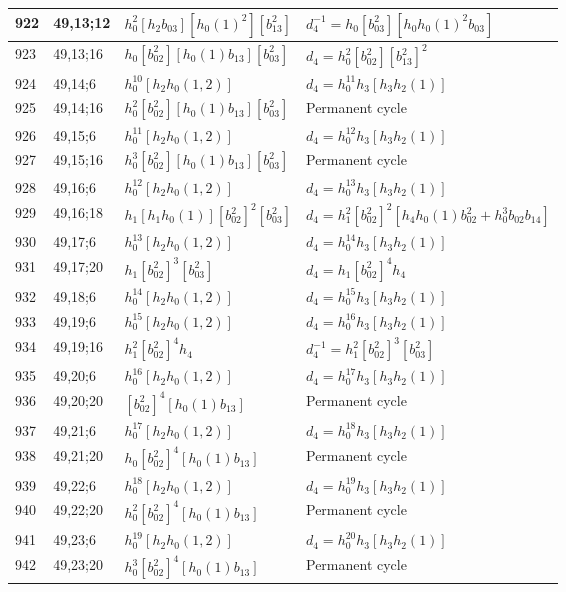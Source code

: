 \documentclass{article}
\begin{document}
\begin{longtable}{|l|l|>{\raggedright\arraybackslash}p{6cm}|>{\raggedright\arraybackslash}p{6cm}|}
\hline
922 & 49,13;12 & $h_0^2[h_2b_{03}][h_0(1)^2][b_{13}^2]$ & $d_{4}^{-1}=h_0[b_{03}^2][h_0h_0(1)^2b_{03}]$\\
\hline
923 & 49,13;16 & $h_0[b_{02}^2][h_0(1)b_{13}][b_{03}^2]$ &$d_{4}=h_0^2[b_{02}^2][b_{13}^2]^2$\\
\hline
924 & 49,14;6 & $h_0^{10}[h_2h_0(1, 2)]$ &$d_{4}=h_0^{11}h_3[h_3h_2(1)]$\\
\hline
925 & 49,14;16 & $h_0^2[b_{02}^2][h_0(1)b_{13}][b_{03}^2]$ & Permanent cycle\\
\hline
926 & 49,15;6 & $h_0^{11}[h_2h_0(1, 2)]$ &$d_{4}=h_0^{12}h_3[h_3h_2(1)]$\\
\hline
927 & 49,15;16 & $h_0^3[b_{02}^2][h_0(1)b_{13}][b_{03}^2]$ & Permanent cycle\\
\hline
928 & 49,16;6 & $h_0^{12}[h_2h_0(1, 2)]$ &$d_{4}=h_0^{13}h_3[h_3h_2(1)]$\\
\hline
929 & 49,16;18 & $h_1[h_1h_0(1)][b_{02}^2]^2[b_{03}^2]$ &$d_{4}=h_1^2[b_{02}^2]^2[h_4h_0(1)b_{02}^2 + h_0^3b_{02}b_{14}]$\\
\hline
930 & 49,17;6 & $h_0^{13}[h_2h_0(1, 2)]$ &$d_{4}=h_0^{14}h_3[h_3h_2(1)]$\\
\hline
931 & 49,17;20 & $h_1[b_{02}^2]^3[b_{03}^2]$ &$d_{4}=h_1[b_{02}^2]^4h_4$\\
\hline
932 & 49,18;6 & $h_0^{14}[h_2h_0(1, 2)]$ &$d_{4}=h_0^{15}h_3[h_3h_2(1)]$\\
\hline
933 & 49,19;6 & $h_0^{15}[h_2h_0(1, 2)]$ &$d_{4}=h_0^{16}h_3[h_3h_2(1)]$\\
\hline
934 & 49,19;16 & $h_1^2[b_{02}^2]^4h_4$ & $d_{4}^{-1}=h_1^2[b_{02}^2]^3[b_{03}^2]$\\
\hline
935 & 49,20;6 & $h_0^{16}[h_2h_0(1, 2)]$ &$d_{4}=h_0^{17}h_3[h_3h_2(1)]$\\
\hline
936 & 49,20;20 & $[b_{02}^2]^4[h_0(1)b_{13}]$ & Permanent cycle\\
\hline
937 & 49,21;6 & $h_0^{17}[h_2h_0(1, 2)]$ &$d_{4}=h_0^{18}h_3[h_3h_2(1)]$\\
\hline
938 & 49,21;20 & $h_0[b_{02}^2]^4[h_0(1)b_{13}]$ & Permanent cycle\\
\hline
939 & 49,22;6 & $h_0^{18}[h_2h_0(1, 2)]$ &$d_{4}=h_0^{19}h_3[h_3h_2(1)]$\\
\hline
940 & 49,22;20 & $h_0^2[b_{02}^2]^4[h_0(1)b_{13}]$ & Permanent cycle\\
\hline
941 & 49,23;6 & $h_0^{19}[h_2h_0(1, 2)]$ &$d_{4}=h_0^{20}h_3[h_3h_2(1)]$\\
\hline
942 & 49,23;20 & $h_0^3[b_{02}^2]^4[h_0(1)b_{13}]$ & Permanent cycle\\

\end{longtable}
\end{document}
